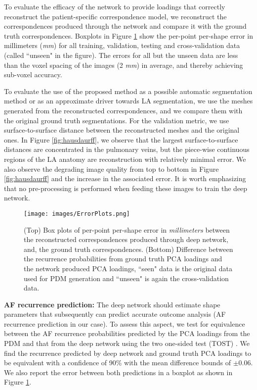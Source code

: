 \documentclass[twocolumn]{cinc}
\begin{document}
To evaluate the efficacy of the network to provide loadings that correctly reconstruct the patient-specific correspondence model, we reconstruct the correspondences produced through the network and compare it with the ground truth correspondences. Boxplots in Figure \ref{fig:boxplots} show the per-point per-shape error in millimeters (\textit{mm}) for all training, validation, testing and cross-validation data (called ``unseen" in the figure). The errors for all but the unseen data are less than the voxel spacing of the images (2 \textit{mm})  in average, and thereby achieving sub-voxel accuracy. 


To evaluate the use of the proposed method as a possible automatic segmentation method or as an approximate driver towards LA segmentation, we use the meshes generated from the reconstructed correspondences, and we compare them with the original ground truth segmentations. For the validation metric, we use surface-to-surface distance between the reconstructed meshes and the original ones. In Figure \ref{fig:hausdaurff}, we observe that the largest surface-to-surface distances are concentrated in the pulmonary veins, but the piece-wise continuous regions of the LA anatomy are reconstruction with relatively minimal error. We also observe the degrading image quality from top to bottom in Figure \ref{fig:hausdaurff} and the increase in the associated error. It is worth emphasizing that no pre-processing is performed when feeding these images to train the deep network.

\begin{figure}[!t]
\centering
\texttt{[image: images/ErrorPlots.png]}
\vspace{-0.1in}
\caption{(Top) Box plots of per-point per-shape error  in \emph{millimeters} between the reconstructed correspondences produced through deep network, and, the ground truth correspondences. (Bottom) Difference between the recurrence probabilities from ground truth PCA loadings and the network produced PCA loadings, ``seen" data is the original data used for PDM generation and ``unseen" is again the cross-validation data.}
\vspace{-0.2in}
\label{fig:boxplots}
\end{figure}

\vspace{0.05in}
\noindent\textbf{AF recurrence prediction: }
The deep network should estimate shape parameters that subsequently can predict accurate outcome analysis (AF recurrence prediction in our case). 
To assess this aspect, we test for equivalence between the AF recurrence probabilities predicted by the PCA loadings from the PDM and that from the deep network using the two one-sided test (TOST) \cite{schuirmann1987tost}. We find the recurrence predicted by deep network and ground truth PCA loadings to be equivalent with a confidence of 90\% with the mean difference bounds of $\pm 0.06$. We also report the error between both predictions in a boxplot as shown in Figure \ref{fig:boxplots}. 
\end{document}
